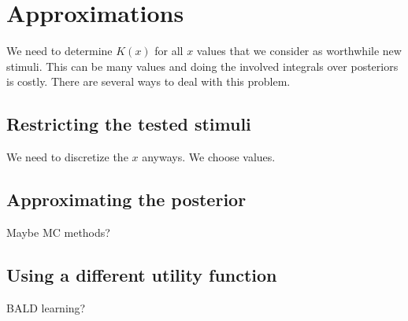 
\section{Approximations} %
\label{sec:approximations}
We need to determine $K(x)$ for all $x$ values that we consider as worthwhile new stimuli. This can be many values and doing the involved integrals over posteriors is costly.
There are several ways to deal with this problem.

\subsection{Restricting the tested stimuli} %
\label{sub:restricting_the_tested_stimuli}
We need to discretize the $x$ anyways. We choose values.

\subsection{Approximating the posterior} %
 \label{sub:approximating_the_posterior}
 Maybe MC methods?

\subsection{Using a different utility function} %
\label{sub:using_a_different_utility_function}
BALD learning?

